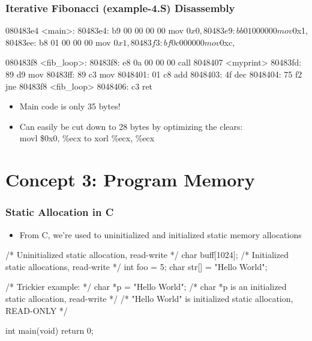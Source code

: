 \documentclass[11pt,xcolor=dvipsnames]{beamer}
\newcommand{\vs}{\vspace{0.5em}}
\begin{document}
\begin{frame}[fragile,t]
\frametitle{Iterative Fibonacci (example-4.S) Disassembly}
\begin{customobjdumpcode}
080483e4 <main>:
 80483e4: b9 00 00 00 00        mov    $0x0,%
 80483e9: bb 01 00 00 00        mov    $0x1,%
 80483ee: b8 01 00 00 00        mov    $0x1,%
 80483f3: bf 0c 00 00 00        mov    $0xc,%

080483f8 <fib_loop>:
 80483f8: e8 0a 00 00 00        call   8048407 <myprint>
 80483fd: 89 d9                 mov    %
 80483ff: 89 c3                 mov    %
 8048401: 01 c8                 add    %
 8048403: 4f                    dec    %
 8048404: 75 f2                 jne    80483f8 <fib_loop>
 8048406: c3                    ret
\end{customobjdumpcode}
\begin{itemize}
  \item Main code is only 35 bytes!
  \item Can easily be cut down to 28 bytes by optimizing the clears: \\
  {\ttfamily movl \$0x0, \%ecx} \; to \; {\ttfamily xorl \%ecx, \%ecx}
\end{itemize}
\end{frame}

\section{Concept 3: Program Memory}

\begin{frame}[fragile,t]
\frametitle{Static Allocation in C}
\begin{itemize}
  \item From C, we're used to uninitialized and initialized static memory allocations
\end{itemize}
\vs
\begin{ccode}
/* Uninitialized static allocation, read-write */
char buff[1024];
/* Initialized static allocations, read-write */
int foo = 5;
char str[] = "Hello World";

/* Trickier example: */
char *p = "Hello World";
/* char *p is an initialized static allocation, read-write */
/* "Hello World" is initialized static allocation, READ-ONLY */

int main(void) {
  return 0;
}
\end{ccode}
\end{frame}
\end{document}
